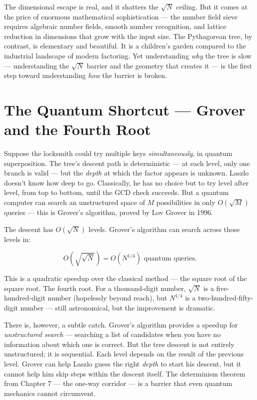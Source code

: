 \documentclass[11pt,twoside,openright]{book}
\theoremstyle{definition}
\theoremstyle{remark}
\begin{document}
The dimensional escape is real, and it shatters the $\sqrt{N}$ ceiling. But it comes at the price of enormous mathematical sophistication --- the number field sieve requires algebraic number fields, smooth number recognition, and lattice reduction in dimensions that grow with the input size. The Pythagorean tree, by contrast, is elementary and beautiful. It is a children's garden compared to the industrial landscape of modern factoring. Yet understanding \textit{why} the tree is slow --- understanding the $\sqrt{N}$ barrier and the geometry that creates it --- is the first step toward understanding \textit{how} the barrier is broken.




\section{The Quantum Shortcut --- Grover and the Fourth Root}

Suppose the locksmith could try multiple keys \textit{simultaneously}, in quantum superposition. The tree's descent path is deterministic --- at each level, only one branch is valid --- but the \textit{depth} at which the factor appears is unknown. Laszlo doesn't know how deep to go. Classically, he has no choice but to try level after level, from top to bottom, until the GCD check succeeds. But a quantum computer can search an unstructured space of $M$ possibilities in only $O(\sqrt{M})$ queries --- this is Grover's algorithm, proved by Lov Grover in 1996.

The descent has $O(\sqrt{N})$ levels. Grover's algorithm can search across those levels in:

\[O\!\left(\sqrt{\sqrt{N}}\right) = O\!\left(N^{1/4}\right) \text{ quantum queries.}\]

This is a quadratic speedup over the classical method --- the square root of the square root. The fourth root. For a thousand-digit number, $\sqrt{N}$ is a five-hundred-digit number (hopelessly beyond reach), but $N^{1/4}$ is a two-hundred-fifty-digit number --- still astronomical, but the improvement is dramatic.

There is, however, a subtle catch. Grover's algorithm provides a speedup for \textit{unstructured search} --- searching a list of candidates when you have no information about which one is correct. But the tree descent is not entirely unstructured; it is sequential. Each level depends on the result of the previous level. Grover can help Laszlo guess the right \textit{depth} to start his descent, but it cannot help him skip steps within the descent itself. The determinism theorem from Chapter 7 --- the one-way corridor --- is a barrier that even quantum mechanics cannot circumvent.
\end{document}
